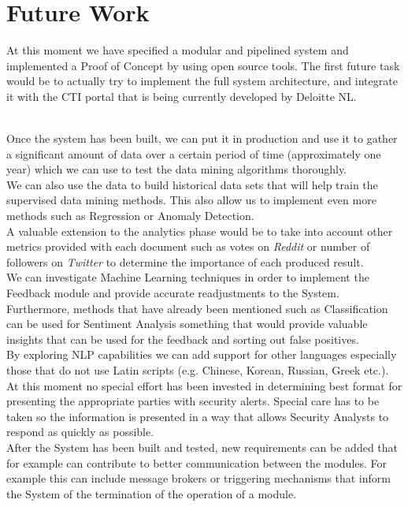 \documentclass[12pt]{article}
\begin{document}
\section{Future Work} 
\parbox{\linewidth}{
At this moment we have specified a modular and pipelined system and implemented a Proof of Concept by using open source tools. The first future task would be to actually try to implement the full system architecture, and integrate it with the CTI portal that is being currently developed by Deloitte NL. }
\hfill \break\\
Once the system has been built, we can put it in production and use it to gather a significant amount of data over a certain period of time (approximately one year) which we can use to test the data mining algorithms thoroughly. 
\hfill \break\\
We can also use the data to build historical data sets that will help train the supervised data mining methods. This also allow us to implement even more methods such as Regression or Anomaly Detection. 
\hfill \break\\
A valuable extension to the analytics phase would be to take into account other metrics provided with each document such as votes on \textit{Reddit} or number of followers on \textit{Twitter} to determine the importance of each produced result.
\hfill \break\\
We can investigate Machine Learning techniques in order to implement the Feedback module and provide accurate readjustments to the System. Furthermore, methods that have already been mentioned such as Classification can be used for Sentiment Analysis something that would provide valuable insights that can be used for the feedback and sorting out false positives.
\hfill \break\\
By exploring NLP capabilities we can add support for other languages especially those that do not use Latin scripts (e.g. Chinese, Korean, Russian, Greek etc.).
\hfill \break\\
At this moment no special effort has been invested in determining best format for presenting the appropriate parties with security alerts. Special care has to be taken so the information is presented in a way that allows Security Analysts to respond as quickly as possible. 
\hfill \break\\
After the System has been built and tested, new requirements can be added that for example can contribute to better communication between the modules. For example this can include message brokers or triggering mechanisms that inform the System of the termination of the operation of a module.
\end{document}
